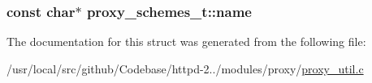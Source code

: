 \subsubsection[{\texorpdfstring{name}{name}}]{\setlength{\rightskip}{0pt plus 5cm}const char$\ast$ proxy\+\_\+schemes\+\_\+t\+::name}\hypertarget{structproxy__schemes__t_aabe6c40adfd8db23b65d36d687b76f2b}{}\label{structproxy__schemes__t_aabe6c40adfd8db23b65d36d687b76f2b}


The documentation for this struct was generated from the following file\+:\begin{DoxyCompactItemize}
\item 
/usr/local/src/github/\+Codebase/httpd-\/2../modules/proxy/\hyperlink{proxy__util_8c}{proxy\+\_\+util.\+c}\end{DoxyCompactItemize}
